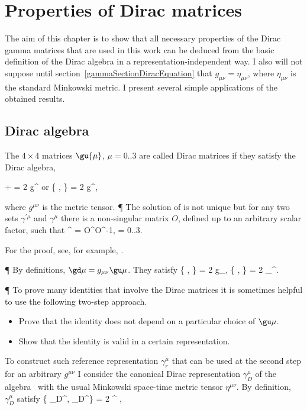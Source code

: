 \chapter{Properties of Dirac matrices}\label{GammaApp}

The aim of this chapter is to show that all necessary properties
of the Dirac gamma matrices that are used in this work can be deduced from
the basic definition of the Dirac algebra in a representation-independent
way. I also will not suppose until section~\ref{gammaSectionDiracEquation}
that $g_{\mu\nu} = \eta_{\mu\nu}$, where $\eta_{\mu\nu}$ is the standard 
Minkowski metric. I present several simple applications
of the obtained results.

\section{Dirac algebra}

The $4\times 4$ matrices $\gu{\mu}$, $\mu=0..3$ are called Dirac matrices
if they satisfy the Dirac algebra,

\gu{\mu}\gu{\nu} + \gu{\nu}\gu{\mu} = 2 g^{\mu\nu}
\quad \mbox{or} \quad \{ \gu{\mu}, \gu{\nu}\} = 2 g^{\mu\nu},
\ee

where $g^{\mu\nu}$ is the metric tensor.
\P
The solution of  is not unique but for any two sets
$\gamma^{\prime\mu}$ and $\gamma^{\mu}$ there is a non-singular matrix $O$,
defined up to an arbitrary scalar factor, such that
\gamma^{\prime\mu} = O\gamma^{\mu}O^{-1}, \quad \mu = 0..3.
\ee

For the proof, see, for example, \cite{gammaTransLawProof}.

\P
By definitions, $\gd\mu = g_{\mu\nu}\gu\mu$. They satisfy
\{ \gd\mu , \gd\nu \} = 2 g_{\mu\nu},
\quad
\{ \gd\mu , \gu\nu \} = 2 \delta_\mu^\nu.
\ee

\P
To prove many identities that involve the Dirac matrices it is sometimes
helpful to use the following two-step approach.
\begin{itemize}
\item
Prove that the identity does not depend on a particular choice of $\gu\mu$.
\item
Show that the identity is valid in a certain representation.
\end{itemize}

To construct such reference representation $\gamma_r^\mu$ that can be used 
at the second step for an arbitrary $g^{\mu\nu}$ 
I consider the canonical Dirac representation $\gamma^\mu_D$ 
of the algebra~ with the usual Minkowski space-time
metric tensor $\eta^{\mu\nu}$. By definition, $\gamma^\mu_D$ 
satisfy
\{ \gamma_D^{\mu}, \gamma_D^{\nu}\} = 2 \eta^{\mu\nu}
,
\ee

